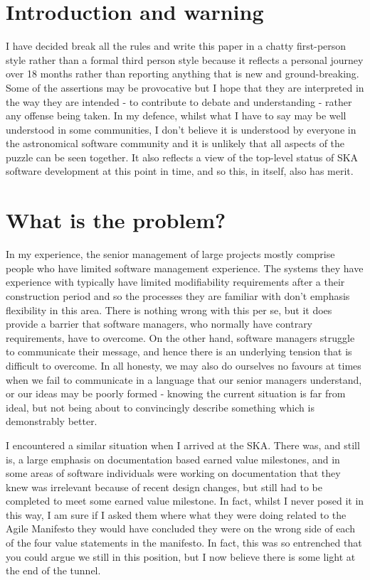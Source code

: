 \documentclass[11pt,twoside]{article}
\begin{document}
\section{Introduction and warning}
I have decided break all the rules and write this paper in a chatty first-person style rather than a formal third person style because it reflects a personal journey over 18 months rather than reporting anything that is new and ground-breaking. Some of the assertions may be provocative but I hope that they are interpreted in the way they are intended - to contribute to debate and understanding - rather any offense being taken. In my defence, whilst what I have to say may be well understood in some communities, I don't believe it is understood by everyone in the astronomical software community and it is unlikely that all aspects of the puzzle can be seen together. It also reflects a view of the top-level status of SKA software development at this point in time, and so this, in itself, also has merit.

\section{What is the problem?}
In my experience, the senior management of large projects mostly comprise people who have limited software management experience. The systems they have experience with typically have limited modifiability requirements after a their construction period and so the processes they are familiar with don't emphasis flexibility in this area. There is nothing wrong with this per se, but it does provide a barrier that software managers, who normally have contrary requirements, have to overcome. On the other hand, software managers struggle to communicate their message, and hence there is an underlying tension that is difficult to overcome. In all honesty, we may also do ourselves no favours at times when we fail to communicate in a language that our senior managers understand, or our ideas may be poorly formed - knowing the current situation is far from ideal, but not being about to convincingly describe something which is demonstrably better.

I encountered a similar situation when I arrived at the SKA. There was, and still is, a large emphasis on documentation based earned value milestones, and in some areas of software individuals were working on documentation that they knew was irrelevant because of recent design changes, but still had to be completed to meet some earned value milestone. In fact, whilst I never posed it in this way, I am sure if I asked them where what they were doing related to the Agile Manifesto\cite{agile} they would have concluded they were on the wrong side of each of the four value statements in the manifesto. In fact, this was so entrenched that you could argue we still in this position, but I now believe there is some light at the end of the tunnel.
\end{document}
